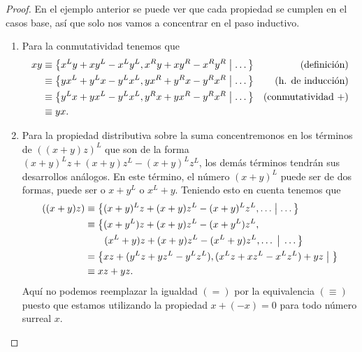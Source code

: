     \begin{proof}
        En el ejemplo anterior se puede ver que cada propiedad se cumplen en el casos base, as\'i que solo nos vamos a concentrar en el paso inductivo.

        \begin{enumerate}
            \item Para la conmutatividad tenemos que 
            \begin{align*}
                xy & \equiv \left\{x^Ly+xy^L-x^Ly^L, x^Ry+xy^R-x^Ry^R\;\middle|\; \dots\right\} &\text{(definici\'on)} \\
                & \equiv \left\{yx^L+y^Lx-y^Lx^L, yx^R+y^Rx-y^Rx^R\;\middle|\; \dots\right\} &\text{(h. de inducci\'on)} \\
                & \equiv \left\{y^Lx+yx^L-y^Lx^L, y^Rx+yx^R-y^Rx^R\;\middle|\; \dots\right\} &\text{(conmutatividad +)} \\
                & \equiv yx.
            \end{align*}
            \item Para la propiedad distributiva sobre la suma concentremonos en los t\'erminos de $((x+y)z)^L$ que son de la forma $(x+y)^Lz + (x+y)z^L - (x+y)^Lz^L$, los dem\'as t\'erminos tendr\'an sus desarrollos an\'alogos. En este t\'ermino, el n\'umero $(x+y)^L$ puede ser de dos formas, puede ser o $x+y^L$ o $x^L+y$. Teniendo esto en cuenta tenemos que 
            \begin{align*}
                ((x+y)z) & \equiv \left\{(x+y)^Lz + (x+y)z^L - (x+y)^Lz^L, \dots\;\middle|\; \dots\right\}\\
                & \equiv \big\{(x+y^L)z + (x+y)z^L - (x+y^L)z^L, \\
                & \quad\quad (x^L+y)z + (x+y)z^L - (x^L+y)z^L, \dots\;\big|\;\dots\big\} \\
                & = \left\{xz+(y^Lz + yz^L - y^Lz^L), (x^Lz + xz^L - x^Lz^L) + yz\;\middle|\; \right\}\\
                & \equiv xz + yz.
            \end{align*}
            Aqu\'i no podemos reemplazar la igualdad $(=)$ por la equivalencia $(\equiv)$ puesto que estamos utilizando la propiedad $x + (-x) = 0$ para todo n\'umero surreal $x$. 
            

\end{enumerate}
\end{proof}
